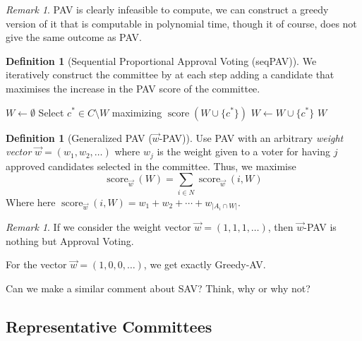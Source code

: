 \documentclass{book}
\theoremstyle{plain}
\theoremstyle{definition}
\newtheorem{definition}[theorem]{Definition}
\theoremstyle{remark}
\newtheorem{remark}[theorem]{Remark}
\begin{document}
\begin{remark}
    PAV is clearly infeasible to compute, we can 
    construct a greedy version of it that is computable in 
    polynomial time, though it of course, does not give 
    the same outcome as PAV.
\end{remark}

\begin{definition}[Sequential Proportional Approval Voting (seqPAV)]
    We iteratively construct the committee
    by at each step adding a candidate that maximises the increase in the
    PAV score of the committee.
\end{definition}

\begin{algorithm}[H]
\caption{Sequential PAV}
\begin{algorithmic}[1]
\State $W \gets \emptyset$
    \State Select $c^* \in C \setminus W$ maximizing $\operatorname{score}(W \cup \{c^*\})$
    \State $W \gets W \cup \{c^*\}$
\EndWhile
\State \Return $W$
\end{algorithmic}
\end{algorithm}

\begin{definition}[Generalized PAV ($\vec{w}$-PAV)]
    Use PAV with an arbitrary \emph{weight vector}
    $\vec{w} = (w_1, w_2, \dots)$ where $w_j$ is the weight given
    to a voter for having $j$ approved candidates selected in the committee.
    Thus, we maximise 
    \[
        \operatorname{score}_{\vec{w}}(W) = \sum_{i \in N} \operatorname{score}_{\vec{w}}(i, W)
    \]
    Where here $\operatorname{score}_{\vec{w}}(i, W) = w_1 + w_2 + \cdots + w_{|A_i \cap W|}$.
\end{definition}

\begin{remark}
    If we consider the weight vector $\vec{w} = (1, 1, 1, \dots)$, then $\vec{w}$-PAV
    is nothing but Approval Voting.

    For the vector 
    $\vec{w} = (1, 0, 0, \dots)$, we get 
    exactly Greedy-AV.

    Can we make a similar comment about 
    SAV? Think, why or why not?
\end{remark}

\subsection{Representative Committees}
\end{document}
